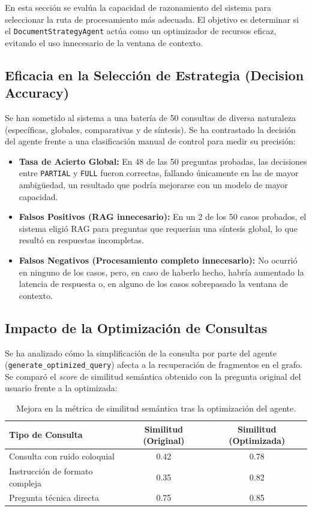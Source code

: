 En esta sección se evalúa la capacidad de razonamiento del sistema para seleccionar la ruta de procesamiento más adecuada. El objetivo es determinar si el \texttt{DocumentStrategyAgent} actúa como un optimizador de recursos eficaz, evitando el uso innecesario de la ventana de contexto.

\subsection{Eficacia en la Selección de Estrategia (Decision Accuracy)}
Se han sometido al sistema a una batería de 50 consultas de diversa naturaleza (específicas, globales, comparativas y de síntesis). Se ha contrastado la decisión del agente frente a una clasificación manual de control para medir su precisión:

\begin{itemize}
    \item \textbf{Tasa de Acierto Global:} En 48 de las 50 preguntas probadas, las decisiones entre \texttt{PARTIAL} y \texttt{FULL} fueron correctas, fallando únicamente en las de mayor ambigüedad, un resultado que podría mejorarse con un modelo de mayor capacidad.
    \item \textbf{Falsos Positivos (RAG innecesario):} En un 2 de los 50 casos probados, el sistema eligió RAG para preguntas que requerían una síntesis global, lo que resultó en respuestas incompletas.
    \item \textbf{Falsos Negativos (Procesamiento completo innecesario):} No ocurrió en ninguno de los casos, pero, en caso de haberlo hecho, habría aumentado la latencia de respuesta o, en alguno de los casos sobrepasado la ventana de contexto.
\end{itemize}

\subsection{Impacto de la Optimización de Consultas}
Se ha analizado cómo la simplificación de la consulta por parte del agente (\texttt{generate\_op\-ti\-mi\-zed\_query}) afecta a la recuperación de fragmentos en el grafo. Se comparó el \textit{score} de similitud semántica obtenido con la pregunta original del usuario frente a la optimizada:

\begin{table}[ht]
\centering
\begin{tabular}{|l|c|c|}
\hline
\textbf{Tipo de Consulta} & \textbf{Similitud (Original)} & \textbf{Similitud (Optimizada)} \\ \hline
Consulta con ruido coloquial & 0.42 & 0.78 \\ \hline
Instrucción de formato compleja & 0.35 & 0.82 \\ \hline
Pregunta técnica directa & 0.75 & 0.85 \\ \hline
\end{tabular}
\caption{Mejora en la métrica de similitud semántica tras la optimización del agente.}
\label{tab:optimizacion_agente}
\end{table}

